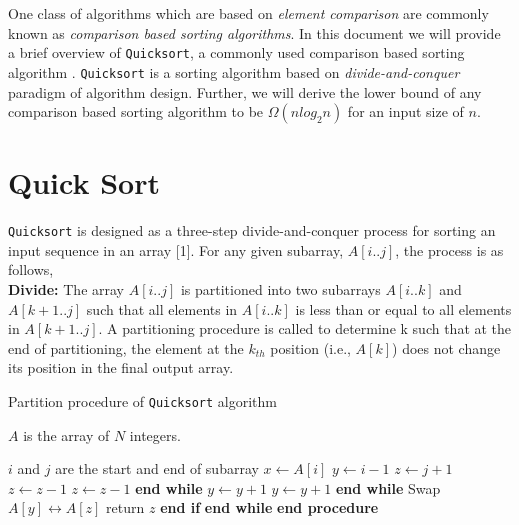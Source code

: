 \documentclass[a4paper, 11pt,twocolumn]{article}
\begin{document}
One class of algorithms which are based on \textit{element comparison} are commonly known as \textit{comparison based sorting algorithms}. In this document we will provide a brief overview of \texttt{Quicksort}, a commonly used comparison based sorting algorithm \cite{Hoare}. \texttt{Quicksort} is a sorting algorithm based on \textit{divide-and-conquer} paradigm of algorithm design. Further, we will derive the lower bound of any comparison based sorting algorithm to be $\Omega (nlog_2n)$ for an input size of $n$.

\section{Quick Sort}
\texttt{Quicksort} is designed as a three-step divide-and-conquer process for sorting an input sequence in an array [1]. For any given subarray, $A[i..j]$, the process is as follows,\\
\textbf{Divide:} The array $A[i..j]$ is partitioned into two subarrays $A[i..k]$ and $A[k + 1..j]$ such that all elements in $A[i..k]$ is less than or equal to all elements in $A[k + 1..j]$. A partitioning procedure is called to determine k such that at the end of partitioning, the element at the $k_{th}$ position (i.e., $A[k]$) does not change its position in the final output array.
\begin{algorithm}
\caption{Partition procedure of \texttt{Quicksort} algorithm}\label{alg:pattern}
      \begin{algorithmic}[1]
              \item [\Comment $A$ is the array of $N$ integers.] 	
              \item [\Comment $i$ and $j$ are the start and end of subarray]
              \State $x \gets A[i] $
              \State $y \gets i-1 $
              \State $z \gets j+1 $
              \label{while1}
              	\State $z \gets z-1 $
                     	\State $z \gets z-1 $
                    \EndWhile
                    \State \textbf{end while}
                    \State $y \gets y+1 $
                    \label{while2}
                        \State $y \gets y+1 $
                    \EndWhile
                    \State \textbf{end while}
                      	\State Swap $A[y] \leftrightarrow A[z]$
                    \Else
                      	\State return $z$
                    \EndIf
          		\State \textbf{end if}
              \EndWhile
              \State \textbf{end while}
          \EndProcedure
          \State \textbf{end procedure}
      \end{algorithmic}
\end{algorithm}\\
\end{document}
